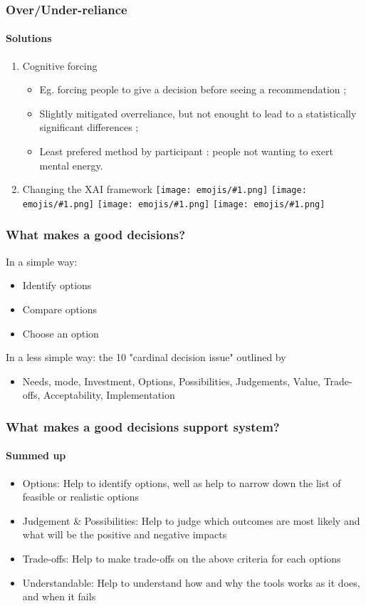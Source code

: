 \documentclass[compress,12pt]{beamer}
\newcommand{\emoji}[1]{\texttt{[image: emojis/\#1.png]}}
\begin{document}
\begin{frame}
      \frametitle{Over/Under-reliance}
      \framesubtitle{Solutions}
      \begin{enumerate}
            \item Cognitive forcing \begin{itemize}
                  \item Eg. forcing people to give a decision before seeing a recommendation ;
                  \item Slightly mitigated overreliance, but not enought to lead to a statistically significant differences ;
                  \item Least prefered method by participant : people not wanting to exert mental energy.
            \end{itemize}
            \item Changing the XAI framework \emoji{smirking-face} \emoji{thinking-face} \emoji{thought-balloon} \emoji{light-bulb}
      \end{enumerate}
\end{frame}

\begin{frame}
      \frametitle{What makes a good decisions?}
      In a simple way: \begin{itemize}
            \item Identify options
            \item Compare options
            \item Choose an option
      \end{itemize}
      In a less simple way: the 10 "cardinal decision issue" outlined by \cite{evidence-based-decision-management} \begin{itemize}
            \item Needs, mode, Investment, Options, Possibilities, Judgements, Value, Trade-offs, Acceptability, Implementation
      \end{itemize}
\end{frame}

\begin{frame}
      \frametitle{What makes a good decisions support system?}
      \framesubtitle{Summed up}
      \begin{itemize}
            \item Options: Help to identify options, well as help to narrow down the list of feasible or realistic options
            \item Judgement \& Possibilities: Help to judge which outcomes are most likely and what will be the positive and negative impacts
            \item Trade-offs: Help to make trade-offs on the above criteria for each options
            \item Understandable: Help to understand how and why the tools works as it does, and when it fails
      \end{itemize}
\end{frame}
\end{document}
